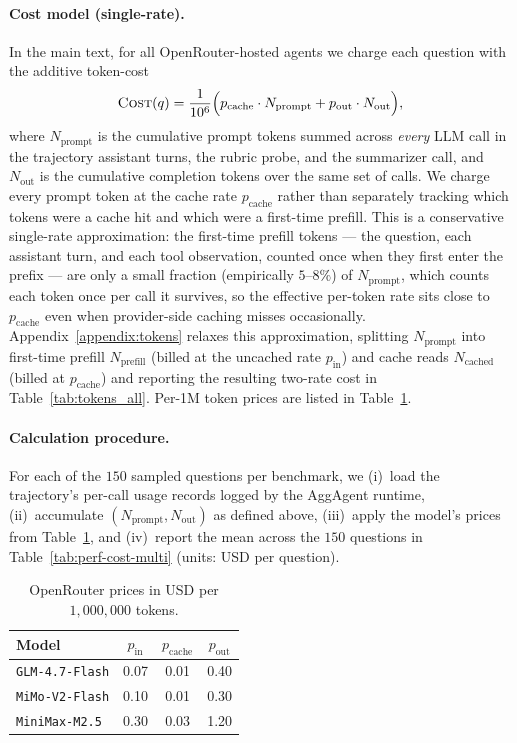 \documentclass{article}
\begin{document}
\paragraph{Cost model (single-rate).} In the main text, for all
OpenRouter-hosted agents we charge each question with the additive
token-cost
\[
\textsc{Cost}(q)
= \frac{1}{10^6}\Big(
  p_{\text{cache}} \cdot N_{\text{prompt}}
  + p_{\text{out}} \cdot N_{\text{out}}
\Big),
\]
where $N_{\text{prompt}}$ is the cumulative prompt tokens summed across \emph{every} LLM call in
the trajectory assistant turns, the rubric probe, and the
summarizer call, and $N_{\text{out}}$ is the cumulative completion
tokens over the same set of calls.
We charge every prompt token at the cache rate $p_{\text{cache}}$
rather than separately tracking which tokens were a cache hit and which
were a first-time prefill. This is a conservative single-rate
approximation: the first-time prefill tokens --- the question, each
assistant turn, and each tool observation, counted once when they first
enter the prefix --- are only a small fraction (empirically $5$--$8\%$)
of $N_{\text{prompt}}$, which counts each token once per call it
survives, so the effective per-token rate sits close to
$p_{\text{cache}}$ even when provider-side caching misses occasionally.
Appendix~\ref{appendix:tokens} relaxes this approximation, splitting
$N_{\text{prompt}}$ into first-time prefill $N_{\text{prefill}}$ (billed
at the uncached rate $p_{\text{in}}$) and cache reads $N_{\text{cached}}$
(billed at $p_{\text{cache}}$) and reporting the resulting two-rate cost
in Table~\ref{tab:tokens_all}. Per-1M token prices are
listed in Table~\ref{tab:openrouter_pricing}.

\paragraph{Calculation procedure.} For each of the $150$ sampled
questions per benchmark, we (i)~load the trajectory's per-call usage
records logged by the AggAgent runtime, (ii)~accumulate
$(N_{\text{prompt}}, N_{\text{out}})$ as defined above,
(iii)~apply the model's prices from
Table~\ref{tab:openrouter_pricing}, and (iv)~report the mean across
the $150$ questions in Table~\ref{tab:perf-cost-multi} (units: USD per
question).

\begin{table}[h!]
\centering
\caption{OpenRouter prices in USD per $1{,}000{,}000$ tokens.}
\label{tab:openrouter_pricing}
\setlength{\tabcolsep}{8pt}
\begin{tabular}{lccc}
\toprule
\textbf{Model} & $p_{\text{in}}$ & $p_{\text{cache}}$ & $p_{\text{out}}$ \\
\midrule
\texttt{GLM-4.7-Flash}   & 0.07 & 0.01 & 0.40 \\
\texttt{MiMo-V2-Flash}   & 0.10 & 0.01 & 0.30 \\
\texttt{MiniMax-M2.5}    & 0.30 & 0.03 & 1.20 \\
\bottomrule
\end{tabular}
\end{table}
\end{document}
